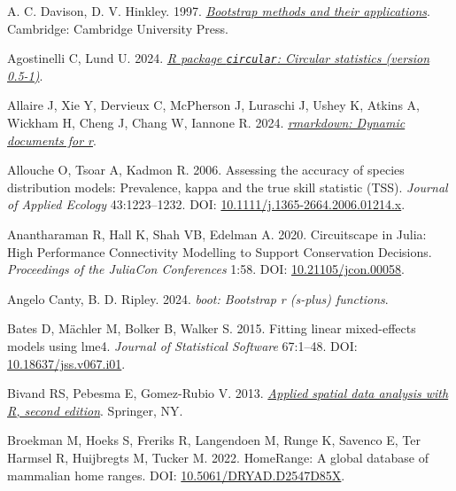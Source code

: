\documentclass[10pt,a4paper]{article}
\newlength{\cslhangindent}
\newenvironment{CSLReferences}[2] %
 {\begin{list}{}{%
  \setlength{\itemindent}{0pt}
  \setlength{\leftmargin}{0pt}
  \setlength{\parsep}{0pt}
  \ifodd #1
   \setlength{\leftmargin}{\cslhangindent}
   \setlength{\itemindent}{-1\cslhangindent}
  \fi
  \setlength{\itemsep}{#2\baselineskip}}}
 {\end{list}}
\begin{document}
\label{refs}
\begin{CSLReferences}{1}{0}
A. C. Davison, D. V. Hinkley. 1997. \emph{\href{https://doi:10.1017/CBO9780511802843}{Bootstrap methods and their applications}}. Cambridge: Cambridge University Press.

Agostinelli C, Lund U. 2024. \emph{\href{https://CRAN.R-project.org/package=circular}{{R} package \texttt{circular}: Circular statistics (version 0.5-1)}}.

Allaire J, Xie Y, Dervieux C, McPherson J, Luraschi J, Ushey K, Atkins A, Wickham H, Cheng J, Chang W, Iannone R. 2024. \emph{\href{https://github.com/rstudio/rmarkdown}{{rmarkdown}: Dynamic documents for r}}.

Allouche O, Tsoar A, Kadmon R. 2006. Assessing the accuracy of species distribution models: Prevalence, kappa and the true skill statistic ({TSS}). \emph{Journal of Applied Ecology} 43:1223--1232. DOI: \href{https://doi.org/10.1111/j.1365-2664.2006.01214.x}{10.1111/j.1365-2664.2006.01214.x}.

Anantharaman R, Hall K, Shah VB, Edelman A. 2020. Circuitscape in {Julia}: {High} {Performance} {Connectivity} {Modelling} to {Support} {Conservation} {Decisions}. \emph{Proceedings of the JuliaCon Conferences} 1:58. DOI: \href{https://doi.org/10.21105/jcon.00058}{10.21105/jcon.00058}.

Angelo Canty, B. D. Ripley. 2024. \emph{{boot}: Bootstrap r (s-plus) functions}.

Bates D, Mächler M, Bolker B, Walker S. 2015. Fitting linear mixed-effects models using {lme4}. \emph{Journal of Statistical Software} 67:1--48. DOI: \href{https://doi.org/10.18637/jss.v067.i01}{10.18637/jss.v067.i01}.

Bivand RS, Pebesma E, Gomez-Rubio V. 2013. \emph{\href{https://asdar-book.org/}{Applied spatial data analysis with {R}, second edition}}. Springer, NY.

Broekman M, Hoeks S, Freriks R, Langendoen M, Runge K, Savenco E, Ter Harmsel R, Huijbregts M, Tucker M. 2022. {HomeRange}: {A} global database of mammalian home ranges. DOI: \href{https://doi.org/10.5061/DRYAD.D2547D85X}{10.5061/DRYAD.D2547D85X}.


\end{CSLReferences}
\end{document}
